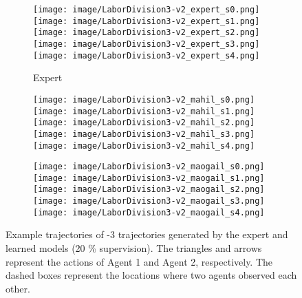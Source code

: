 \begin{figure}[h]
  \def\subfwid{.80}
  \def\figwid{.18}
  \centering
  \begin{subfigure}[t]{\subfwid\linewidth}
      \centering
      \texttt{[image: image/LaborDivision3-v2\_expert\_s0.png]}\hspace{0.5ex}
      \texttt{[image: image/LaborDivision3-v2\_expert\_s1.png]}\hspace{0.5ex}
      \texttt{[image: image/LaborDivision3-v2\_expert\_s2.png]}\hspace{0.5ex}
      \texttt{[image: image/LaborDivision3-v2\_expert\_s3.png]}\hspace{0.5ex}
      \texttt{[image: image/LaborDivision3-v2\_expert\_s4.png]}
      \caption{Expert}
      \label{fig: expert interaction paths}
  \end{subfigure}
  \begin{subfigure}[t]{\subfwid\linewidth}
      \centering
      \texttt{[image: image/LaborDivision3-v2\_mahil\_s0.png]}\hspace{0.5ex}
      \texttt{[image: image/LaborDivision3-v2\_mahil\_s1.png]}\hspace{0.5ex}
      \texttt{[image: image/LaborDivision3-v2\_mahil\_s2.png]}\hspace{0.5ex}
      \texttt{[image: image/LaborDivision3-v2\_mahil\_s3.png]}\hspace{0.5ex}
      \texttt{[image: image/LaborDivision3-v2\_mahil\_s4.png]}
      \caption{\ouralg}
  \end{subfigure}
  \begin{subfigure}[t]{\subfwid\linewidth}
      \centering
      \texttt{[image: image/LaborDivision3-v2\_maogail\_s0.png]}\hspace{0.5ex}
      \texttt{[image: image/LaborDivision3-v2\_maogail\_s1.png]}\hspace{0.5ex}
      \texttt{[image: image/LaborDivision3-v2\_maogail\_s2.png]}\hspace{0.5ex}
      \texttt{[image: image/LaborDivision3-v2\_maogail\_s3.png]}\hspace{0.5ex}
      \texttt{[image: image/LaborDivision3-v2\_maogail\_s4.png]}
      \caption{\maogail}
  \end{subfigure}
  \captionsetup{subrefformat=parens}
  \caption{Example trajectories of \simplemulti-$3$ trajectories generated by the expert and learned models (20 \% supervision). The triangles and arrows represent the actions of Agent 1 and Agent 2, respectively. The dashed boxes represent the locations where two agents observed each other. }%
  \label{fig: paths}
\end{figure}


